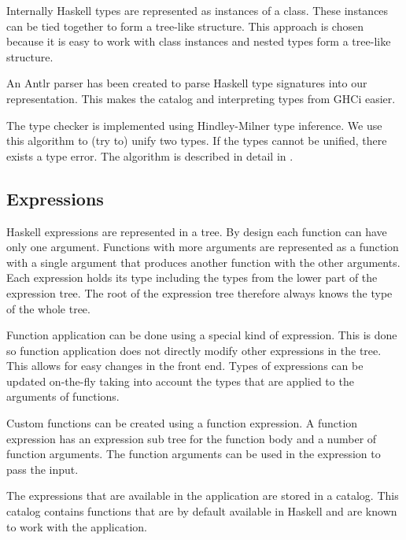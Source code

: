 Internally Haskell types are represented as instances of a class. These instances can be tied together to form a
tree-like structure. This approach is chosen because it is easy to work with class instances and nested types form
a tree-like structure. 

An Antlr parser has been created to parse Haskell type signatures into our representation. This makes the catalog and interpreting types from GHCi easier.

The type checker is implemented using Hindley-Milner type inference. We use this algorithm to (try to) unify two
types. If the types cannot be unified, there exists a type error. The algorithm is described in detail in
\cite{borisov}.  

\subsection{Expressions}

Haskell expressions are represented in a tree. By design each function can have only one argument. Functions with more
arguments are represented as a function with a single argument that produces another function with the other arguments.
Each expression holds its type including the types from the lower part of the expression tree. The root of the
expression tree therefore always knows the type of the whole tree.

Function application can be done using a special kind of expression. This is done so function application does not
directly modify other expressions in the tree. This allows for easy changes in the front end. Types of expressions can
be updated on-the-fly taking into account the types that are applied to the arguments of functions.

Custom functions can be created using a function expression.
A function expression has an expression sub tree for the function body and a number of function arguments.
The function arguments can be used in the expression to pass the input.

The expressions that are available in the application are stored in a catalog. This catalog contains functions that are
by default available in Haskell and are known to work with the application.
